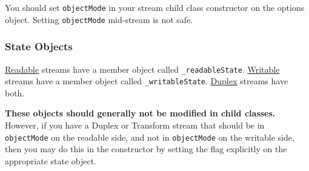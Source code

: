 You should set \texttt{objectMode} in your stream child class
constructor on the options object. Setting \texttt{objectMode}
mid-stream is not safe.

\subsubsection{State Objects}\label{state-objects}

\hyperref[streamux5fclassux5fstreamux5freadable]{Readable} streams have
a member object called \texttt{\_readableState}.
\hyperref[streamux5fclassux5fstreamux5fwritable]{Writable} streams have
a member object called \texttt{\_writableState}.
\hyperref[streamux5fclassux5fstreamux5fduplex]{Duplex} streams have
both.

\textbf{These objects should generally not be modified in child
classes.} However, if you have a Duplex or Transform stream that should
be in \texttt{objectMode} on the readable side, and not in
\texttt{objectMode} on the writable side, then you may do this in the
constructor by setting the flag explicitly on the appropriate state
object.

